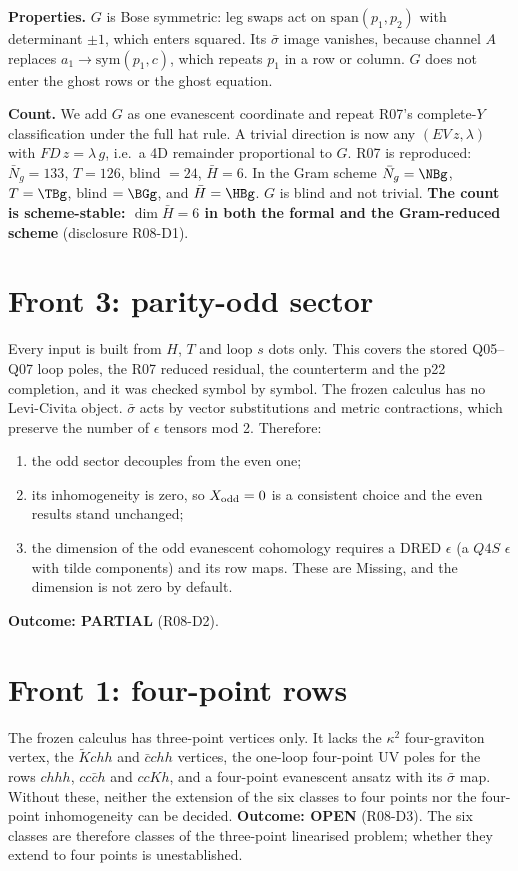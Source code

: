 \documentclass[11pt]{article}
\begin{document}
\textbf{Properties.} $G$ is Bose symmetric: leg swaps act on $\mathrm{span}(p_1,p_2)$ with determinant $\pm1$, which
enters squared. Its $\bar\sigma$ image vanishes, because channel $A$ replaces $a_1\to\mathrm{sym}(p_1,c)$, which repeats
$p_1$ in a row or column. $G$ does not enter the ghost rows or the ghost equation.

\textbf{Count.} We add $G$ as one evanescent coordinate and repeat R07's complete-$Y$ classification under the full hat
rule. A trivial direction is now any $(EV\,z,\lambda)$ with $FD\,z=\lambda\,g$, i.e.\ a 4D remainder proportional to $G$.
R07 is reproduced: $\bar N_g=133$, $T=126$, blind $=24$, $\bar H=6$. In the Gram scheme $\bar N_g=\NBg$, $T=\TBg$, blind
$=\BGg$, and $\bar H=\HBg$. $G$ is blind and not trivial. \textbf{The count is scheme-stable: $\dim\bar H=6$ in both the
formal and the Gram-reduced scheme} (disclosure R08-D1).

\section{Front 3: parity-odd sector}
Every input is built from $H$, $T$ and loop $s$ dots only. This covers the stored Q05--Q07 loop poles, the R07 reduced
residual, the counterterm and the p22 completion, and it was checked symbol by symbol. The frozen calculus has no
Levi-Civita object. $\bar\sigma$ acts by vector substitutions and metric contractions, which preserve the number of
$\epsilon$ tensors mod 2. Therefore:
\begin{enumerate}
\item the odd sector decouples from the even one;
\item its inhomogeneity is zero, so $X_{\rm odd}=0$ is a consistent choice and the even results stand unchanged;
\item the dimension of the odd evanescent cohomology requires a DRED $\epsilon$ (a $Q4S$ $\epsilon$ with tilde
components) and its row maps. These are Missing, and the dimension is not zero by default.
\end{enumerate}
\textbf{Outcome: PARTIAL} (R08-D2).

\section{Front 1: four-point rows}
The frozen calculus has three-point vertices only. It lacks the $\kappa^2$ four-graviton vertex, the $\tilde Kchh$ and
$\bar cchh$ vertices, the one-loop four-point UV poles for the rows $chhh$, $cc\bar ch$ and $ccKh$, and a four-point
evanescent ansatz with its $\bar\sigma$ map. Without these, neither the extension of the six classes to four points nor
the four-point inhomogeneity can be decided. \textbf{Outcome: OPEN} (R08-D3). The six classes are therefore classes of the
three-point linearised problem; whether they extend to four points is unestablished.
\end{document}
